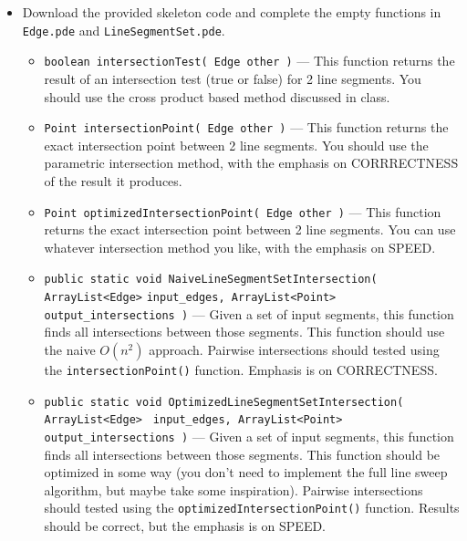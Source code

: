 \documentclass[a4paper,12pt]{article}
\begin{document}
\begin{itemize}

\item Download the provided skeleton code and complete the empty functions in \texttt{Edge.pde} and \texttt{LineSegmentSet.pde}.

\begin{itemize}

   \item \texttt{boolean intersectionTest( Edge other )} --- This function returns the result of an intersection test (true or false) for 2 line segments. You should use the cross product based method discussed in class.
   
   \item \texttt{Point intersectionPoint( Edge other )} --- This function returns the exact intersection point between 2 line segments. You should use the parametric intersection method, with the emphasis on CORRRECTNESS of the result it produces.
   
   \item \texttt{Point optimizedIntersectionPoint( Edge other )} --- This function returns the exact intersection point between 2 line segments. You can use whatever intersection method you like, with the emphasis on SPEED.
   
\item \texttt{public static void NaiveLineSegmentSetIntersection( 
ArrayList<Edge>} \linebreak
\texttt{input\_edges, ArrayList<Point> output\_intersections )} --- Given a set of input segments, this function finds all intersections between those segments. 
This function should use the naive $O(n^2)$ approach. 
Pairwise intersections should tested using the \texttt{intersectionPoint()} function. Emphasis is on CORRECTNESS.

\item \texttt{public static void OptimizedLineSegmentSetIntersection( ArrayList<Edge> } \linebreak
\texttt{input\_edges, ArrayList<Point> output\_intersections )} --- Given a set of input segments, this function finds all intersections between those segments. 
This function should be optimized in some way (you don't need to implement the full line sweep algorithm, but maybe take some inspiration). 
Pairwise intersections should tested using the \texttt{optimizedIntersectionPoint()} function. Results should be correct, but the emphasis is on SPEED.
   
\end{itemize}


\end{itemize}
\end{document}
